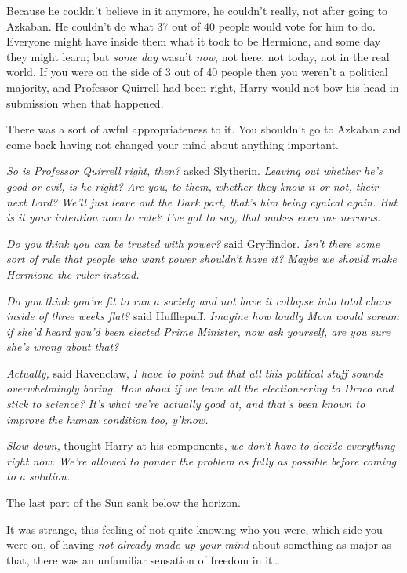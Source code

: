 Because he couldn't believe in it anymore, he couldn't really, not after going to Azkaban. He couldn't do what 37 out of 40 people would vote for him to do. Everyone might have inside them what it took to be Hermione, and some day they might learn; but \emph{some day} wasn't \emph{now}, not here, not today, not in the real world. If you were on the side of 3 out of 40 people then you weren't a political majority, and Professor Quirrell had been right, Harry would not bow his head in submission when that happened.

There was a sort of awful appropriateness to it. You shouldn't go to Azkaban and come back having not changed your mind about anything important.

\emph{So is Professor Quirrell right, then?} asked Slytherin. \emph{Leaving out whether he's good or evil, is he \emph{right}? Are you, to them, whether they know it or not, their next Lord? We'll just leave out the Dark part, that's him being cynical again. But is it your intention now to rule? I've got to say, that makes even \emph{me} nervous.}

\emph{Do you think you can be trusted with power?} said Gryffindor. \emph{Isn't there some sort of rule that people who want power shouldn't have it? Maybe we should make Hermione the ruler instead.}

\emph{Do you think you're fit to run a society and not have it collapse into total chaos inside of three weeks flat?} said Hufflepuff. \emph{Imagine how loudly Mom would scream if she'd heard you'd been elected Prime Minister, now ask yourself, are you sure she's wrong about that?}

\emph{Actually,} said Ravenclaw, \emph{I have to point out that all this political stuff sounds overwhelmingly boring. How about if we leave all the electioneering to Draco and stick to science? It's what we're actually good at, and that's been known to improve the human condition too, y'know.}

\emph{Slow down,} thought Harry at his components, \emph{we don't have to decide everything right now. We're allowed to ponder the problem as fully as possible before coming to a solution.}

The last part of the Sun sank below the horizon.

It was strange, this feeling of not quite knowing who you were, which side you were on, of having \emph{not already made up your mind} about something as major as that, there was an unfamiliar sensation of freedom in it{\ldots}

